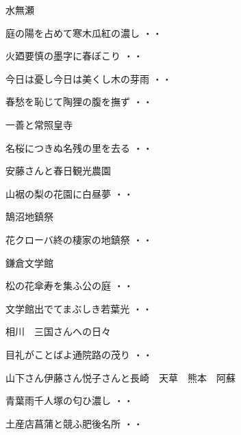 水無瀬
\begin{shiika}庭の陽を占めて寒木瓜紅の濃し
\hfill{・・}\end{shiika}
\begin{shiika}火廼要慎の墨字に春ぼこり
\hfill{・・}\end{shiika}
\begin{shiika}今日は憂し今日は美くし木の芽雨
\hfill{・・}\end{shiika}
\begin{shiika}春愁を恥じて陶狸の腹を撫ず
\hfill{・・}\end{shiika}
\vspace{0.6cm}
一善と常照皇寺
\begin{shiika}名桜につきぬ名残の里を去る
\hfill{・・}\end{shiika}
\vspace{0.6cm}
安藤さんと春日観光農園
\begin{shiika}山裾の梨の花園に白昼夢
\hfill{・・}\end{shiika}
\vspace{0.6cm}
鵠沼地鎮祭
\begin{shiika}花クローバ終の棲家の地鎮祭
\hfill{・・}\end{shiika}
\vspace{0.6cm}
鎌倉文学館
\begin{shiika}松の花傘寿を集ふ公の庭
\hfill{・・}\end{shiika}
\begin{shiika}文学館出でてまぶしき若葉光
\hfill{・・}\end{shiika}
\vspace{0.6cm}
相川　三国さんへの日々
\begin{shiika}目礼がことばよ通院路の茂り
\hfill{・・}\end{shiika}
\vspace{0.6cm}
山下さん伊藤さん悦子さんと長崎　天草　熊本　阿蘇
\begin{shiika}青葉雨千人塚の匂ひ濃し
\hfill{・・}\end{shiika}
\begin{shiika}土産店菖蒲と競ふ肥後名所
\hfill{・・}\end{shiika}
